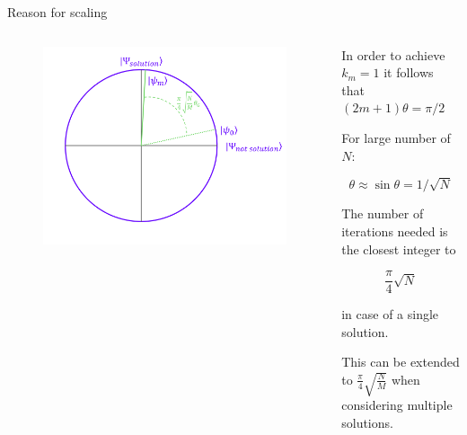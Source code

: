 \documentclass[11p,aspectratio=169]{beamer}
\begin{document}
\begin{frame}{Reason for scaling}
    \begin{columns}
        \begin{column}{0.5 \textwidth}
            \begin{figure}
                \includegraphics[width= \textwidth]{figures/grover2.png}
            \end{figure}
        \end{column}

        \begin{column}{0.5 \textwidth}
            In order to achieve $k_m = 1$ it follows that $(2 m + 1) \theta = \pi / 2$

    For large number of $N$:

    \begin{equation*}
        \theta \approx \sin \theta = 1 / \sqrt{N}
    \end{equation*}

    The number of iterations needed is the closest integer to

    $$ \frac{\pi}{4} \sqrt{N}$$

    in case of a single solution.

    This can be extended to $ \frac{\pi}{4} \sqrt{\frac{N}{M}}$ when considering
    multiple solutions.
        \end{column}
    \end{columns}
\end{frame}
\end{document}
